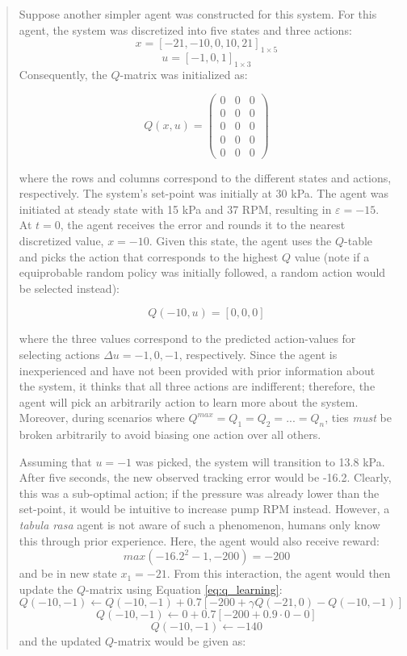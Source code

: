 \begin{quote}
    Suppose another simpler agent was constructed for this system. For this agent, the system was discretized into five states and three actions:
    $$x = [-21, -10, 0, 10, 21]_{1 \times 5}$$
    $$u = [-1, 0, 1]_{1 \times 3} $$
    Consequently, the $Q$-matrix was initialized as:
    
    $$ Q(x, u) = \left(\begin{matrix}   0 & 0 & 0 \\
                                        0 & 0 & 0 \\
                                        0 & 0 & 0 \\
                                        0 & 0 & 0 \\
                                        0 & 0 & 0 \end{matrix}\right) $$
    
    where the rows and columns correspond to the different states and actions, respectively. The system's set-point was initially at 30 kPa. The agent was initiated at steady state with 15 kPa and 37 RPM, resulting in $\varepsilon=-15$. At $t = 0$, the agent receives the error and rounds it to the nearest discretized value, $x = -10$.  Given this state, the agent uses the $Q$-table and picks the action that corresponds to the highest $Q$ value (note if a equiprobable random policy was initially followed, a random action would be selected instead):

        $$Q(-10, u) = [0, 0, 0]$$

    where the three values correspond to the predicted action-values for selecting actions $\Delta u = -1, 0, -1$, respectively. Since the agent is inexperienced and have not been provided with prior information about the system, it thinks that all three actions are indifferent; therefore, the agent will pick an arbitrarily action to learn more about the system. Moreover, during scenarios where $Q^{max} = Q_1 = Q_2 = ... = Q_n$, ties \textit{must} be broken arbitrarily to avoid biasing one action over all others.
    
    Assuming that $u = -1$ was picked, the system will transition to 13.8 kPa. After five seconds, the new observed tracking error would be -16.2. Clearly, this was a sub-optimal action; if the pressure was already lower than the set-point, it would be intuitive to increase pump RPM instead. However, a \textit{tabula rasa} agent is not aware of such a phenomenon, humans only know this through prior experience. Here, the agent would also receive reward:
    $$max(-16.2^2 - 1, -200) = -200$$ 
    and be in new state $x_1 = -21$.  From this interaction, the agent would then update the $Q$-matrix using Equation \ref{eq:q_learning}:
    $$Q(-10, -1) \leftarrow Q(-10, -1) + 0.7 [-200 + \gamma Q(-21, 0) - Q(-10, -1)]$$
    $$Q(-10, -1) \leftarrow 0 + 0.7 [-200 + 0.9 \cdot 0 - 0]$$
    $$Q(-10, -1) \leftarrow -140 $$
    and the updated $Q$-matrix would be given as:
    

\end{quote}

